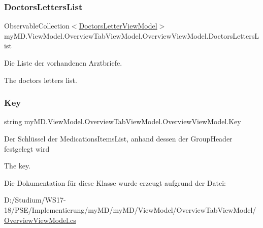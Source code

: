 \subsubsection{\texorpdfstring{Doctors\+Letters\+List}{DoctorsLettersList}}
{\footnotesize\ttfamily Observable\+Collection$<$\mbox{\hyperlink{classmy_m_d_1_1_view_model_1_1_overview_tab_view_model_1_1_doctors_letter_view_model}{Doctors\+Letter\+View\+Model}}$>$ my\+M\+D.\+View\+Model.\+Overview\+Tab\+View\+Model.\+Overview\+View\+Model.\+Doctors\+Letters\+List\hspace{0.3cm}{\ttfamily [get]}}



Die Liste der vorhandenen Arztbriefe. 

The doctors letters list.\mbox{\label{classmy_m_d_1_1_view_model_1_1_overview_tab_view_model_1_1_overview_view_model_a2ce7b1e7da886e5fccb312edaa49b0be}} 
\subsubsection{\texorpdfstring{Key}{Key}}
{\footnotesize\ttfamily string my\+M\+D.\+View\+Model.\+Overview\+Tab\+View\+Model.\+Overview\+View\+Model.\+Key\hspace{0.3cm}{\ttfamily [get]}}



Der Schlüssel der Medications\+Items\+List, anhand dessen der Group\+Header festgelegt wird 

The key.

Die Dokumentation für diese Klasse wurde erzeugt aufgrund der Datei\+:\begin{DoxyCompactItemize}
\item 
D\+:/\+Studium/\+W\+S17-\/18/\+P\+S\+E/\+Implementierung/my\+M\+D/my\+M\+D/\+View\+Model/\+Overview\+Tab\+View\+Model/\mbox{\hyperlink{_overview_view_model_8cs}{Overview\+View\+Model.\+cs}}\end{DoxyCompactItemize}

